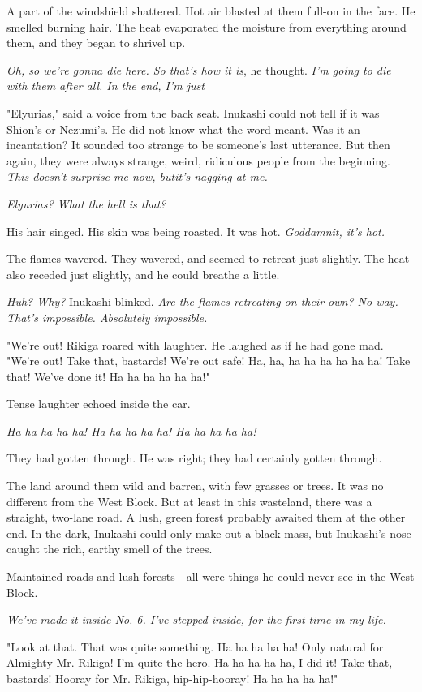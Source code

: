 A part of the windshield shattered. Hot air blasted at them full-on in
the face. He smelled burning hair. The heat evaporated the moisture from
everything around them, and they began to shrivel up.

\emph{Oh, so we're gonna die here. So that's how it is}, he thought. \emph{I'm going
to die with them after all. In the end, I'm just\el }

"Elyurias," said a voice from the back seat. Inukashi could not tell if
it was Shion's or Nezumi's. He did not know what the word meant. Was it
an incantation? It sounded too strange to be someone's last utterance.
But then again, they were always strange, weird, ridiculous people from
the beginning. \emph{This doesn't surprise me now, but\el it's nagging at me.}

\emph{Elyurias? What the hell is that?}

His hair singed. His skin was being roasted. It was hot. \emph{Goddamnit, it's
hot.}

The flames wavered. They wavered, and seemed to retreat just slightly.
The heat also receded just slightly, and he could breathe a little.

\emph{Huh? Why?} Inukashi blinked. \emph{Are the flames retreating on their own? No
way. That's impossible. Absolutely impossible.}

"We're out! Rikiga roared with laughter. He laughed as if he had gone
mad. "We're out! Take that, bastards! We're out safe! Ha, ha, ha ha ha
ha ha ha! Take that! We've done it! Ha ha ha ha ha ha!"

Tense laughter echoed inside the car.

\emph{Ha ha ha ha ha! Ha ha ha ha ha! Ha ha ha ha ha!}

They had gotten through. He was right; they had certainly gotten
through.

The land around them wild and barren, with few grasses or trees. It was
no different from the West Block. But at least in this wasteland, there
was a straight, two-lane road. A lush, green forest probably awaited
them at the other end. In the dark, Inukashi could only make out a black
mass, but Inukashi's nose caught the rich, earthy smell of the trees.

Maintained roads and lush forests---all were things he could never see in
the West Block.

\emph{We've made it inside No. 6. I've stepped inside, for the first time in
my life.}

"Look at that. That was quite something. Ha ha ha ha ha! Only natural
for Almighty Mr. Rikiga! I'm quite the hero. Ha ha ha ha ha, I did it!
Take that, bastards! Hooray for Mr. Rikiga, hip-hip-hooray! Ha ha ha ha
ha!"

